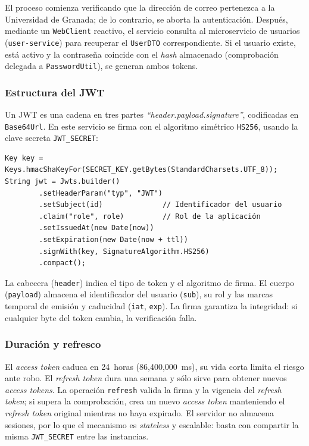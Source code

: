 El proceso comienza verificando que la dirección de correo pertenezca a la Universidad de Granada; 
de lo contrario, se aborta la autenticación.  
Después, mediante un \texttt{WebClient} reactivo, el servicio consulta al microservicio de usuarios 
(\texttt{user-service}) para recuperar el \texttt{UserDTO} correspondiente.  
Si el usuario existe, está activo y la contraseña coincide con el \emph{hash} almacenado (comprobación
delegada a \texttt{PasswordUtil}), se generan ambos tokens.

\subsubsection*{Estructura del JWT}

Un JWT es una cadena en tres partes \emph{``header.payload.signature''}, codificadas en \texttt{Base64Url}.  
En este servicio se firma con el algoritmo simétrico \texttt{HS256}, usando la clave secreta
\lstinline|JWT_SECRET|:

\begin{verbatim}
Key key = Keys.hmacShaKeyFor(SECRET_KEY.getBytes(StandardCharsets.UTF_8));
String jwt = Jwts.builder()
        .setHeaderParam("typ", "JWT")
        .setSubject(id)              // Identificador del usuario
        .claim("role", role)         // Rol de la aplicación
        .setIssuedAt(new Date(now))
        .setExpiration(new Date(now + ttl))
        .signWith(key, SignatureAlgorithm.HS256)
        .compact();
\end{verbatim}

La cabecera (\texttt{header}) indica el tipo de token y el algoritmo de firma.  
El cuerpo (\texttt{payload}) almacena el identificador del usuario (\texttt{sub}), su rol y las marcas
temporal de emisión y caducidad (\texttt{iat}, \texttt{exp}).  
La firma garantiza la integridad: si cualquier byte del token cambia, la verificación falla.

\subsubsection*{Duración y refresco}

El \emph{access token} caduca en 24~horas (86,400,000~ms), su vida corta limita el riesgo ante robo.  
El \emph{refresh token} dura una semana y sólo sirve para
obtener nuevos \emph{access tokens}.  
La operación \texttt{refresh} valida la firma y la vigencia del \emph{refresh token};  
si supera la comprobación, crea un nuevo \emph{access token} manteniendo el \emph{refresh token} 
original mientras no haya expirado.  
El servidor no almacena sesiones, por lo que el mecanismo es \emph{stateless} y escalable: basta con
compartir la misma \lstinline|JWT_SECRET| entre las instancias.

